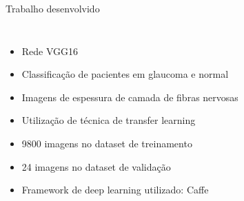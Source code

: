 \documentclass{beamer}
\begin{document}
\begin{frame}{Trabalho desenvolvido}

    \begin{columns}

            \begin{itemize}
                \item Rede VGG16
                \item Classificação de pacientes em glaucoma e normal
                \item Imagens de espessura de camada de fibras nervosas
                \item Utilização de técnica de transfer learning
                \item 9800 imagens no dataset de treinamento
                \item 24 imagens no dataset de validação
                \item Framework de deep learning utilizado: Caffe
            \end{itemize}


        \begin{figure}
            \centering
    
            \qquad
            \qquad
            \qquad
            

\end{figure}
\end{columns}
\end{frame}
\end{document}
